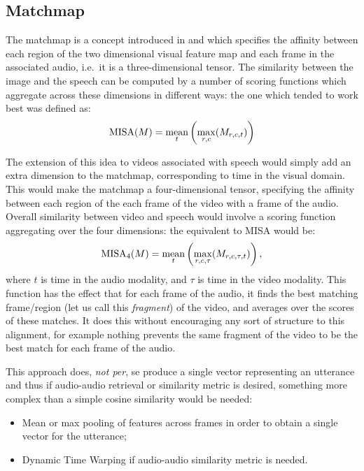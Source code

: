 \subsection{Matchmap}
The matchmap is a concept introduced in \citet{harwath2018jointly} and
which specifies the affinity between each region of the two
dimensional visual feature map and each frame in the associated audio,
i.e.\ it is a three-dimensional tensor. The similarity between the
image and the speech can be computed by a number of scoring functions
which aggregate across these dimensions in different ways: the one
which tended to work best was defined as:
\begin{equation}
  \label{eq:misa}
  \mathrm{MISA}(M) = \operatorname*{mean}_t \left(\max_{r,c}(M_{r,c,t})\right)
\end{equation}

The extension of this idea to videos associated with speech would
simply add an extra dimension to the matchmap, corresponding to time
in the visual domain. This would make the matchmap a four-dimensional
tensor, specifying the affinity between each region of the each frame
of the video with a frame of the audio. Overall similarity between
video and speech would involve a scoring function aggregating over
the four dimensions: the equivalent to MISA would be:
\begin{equation}
  \label{eq:misa4}
  \mathrm{MISA}_4(M) = \operatorname*{mean}_t \left(\max_{r,c,\tau}(M_{r,c,\tau,t})\right),
\end{equation}
where $t$ is time in the audio modality, and $\tau$ is time in the
video modality. This function has the effect that for each frame of
the audio, it finds the best matching frame/region (let us call this
{\it fragment}) of the video, and averages over the scores of these
matches. It does this without encouraging any sort of structure to
this alignment, for example nothing prevents the same fragment of the
video to be the best match for each frame of the audio.

This approach does, \textit{not per}, se produce a single vector
representing an utterance and thus if audio-audio retrieval or
similarity metric is desired, something more complex than a simple
cosine similarity would be needed:

\begin{itemize}
  \label{itemize:pool}
\item Mean or max pooling of features across frames in order to obtain
  a single vector for the utterance;
\item Dynamic Time Warping if audio-audio similarity metric is needed.
\end{itemize}



